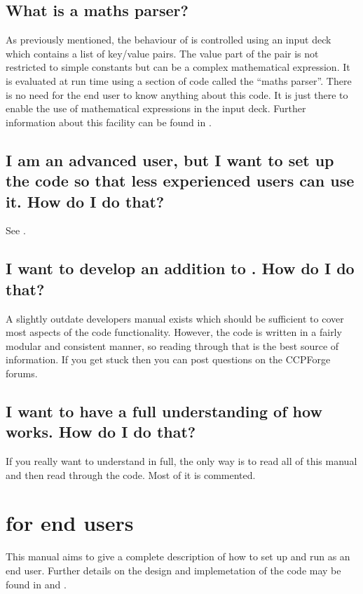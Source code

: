 \subsection{What is a maths parser?}
As previously mentioned, the behaviour of {\EPOCH} is controlled using an
input deck which contains a list of key/value pairs. The value part of the
pair is not restricted to simple constants but can be a complex mathematical
expression. It is evaluated at run time using a section of code called the
``maths parser''. There is no need for the end user to know anything about this
code. It is just there to enable the use of mathematical expressions in the
input deck.
Further information about this facility can be found in
.

\subsection{I am an advanced user, but I want to set up the code so that less
  experienced users can use it. How do I do that?}
See .

\subsection{I want to develop an addition to {\EPOCH}. How do I do that?}
A slightly outdate developers manual exists which should be sufficient to
cover most aspects of the code functionality. However, the code is written
in a fairly modular and consistent manner, so reading through that
is the best source of information. If you get stuck then you can post
questions on the CCPForge forums.

\subsection{I want to have a full understanding of how {\EPOCH} works. How do I
  do that?}
If you really want to understand {\EPOCH}
in full, the only way is to read all of
this manual and then read through the code. Most of it is commented.

\newpage
\section{{\EPOCH} for end users}
\label{sec:endusers}
This manual aims to give a complete description of how to set up and run
{\EPOCH} as an end user. Further details on the design and implemetation of
the code may be found in \citet{Arber} and \citet{Ridgers}.

